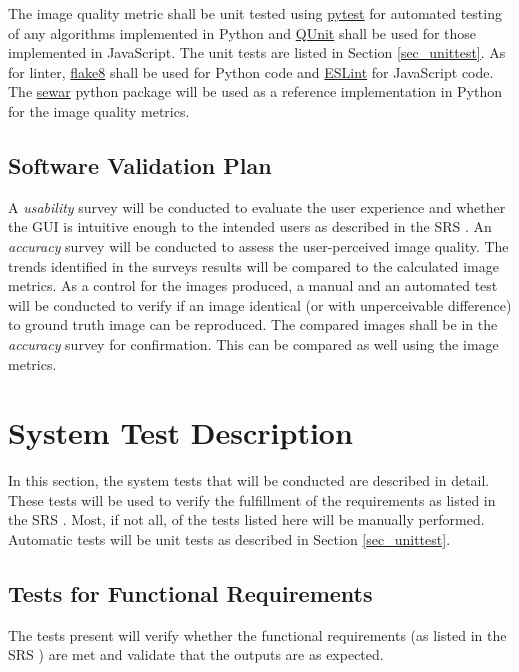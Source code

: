 \documentclass[12pt, titlepage]{article}
\begin{document}
The image quality metric shall be unit tested using \href{https://pytest.org}{pytest} for 
automated testing of any algorithms implemented in Python and \href{https://qunitjs.com}{QUnit} 
shall be used for those implemented in JavaScript. The unit tests are listed in 
Section \ref{sec_unittest}.
As for linter, \href{https://flake8.pycqa.org}{flake8} shall be used for Python code 
and \href{https://eslint.org}{ESLint} for JavaScript code.
The \href{https://github.com/andrewekhalel/sewar}{sewar} python package will be 
used as a reference implementation in Python for the image quality metrics.


\subsection{Software Validation Plan}
A \textit{usability} survey will be conducted to evaluate the user experience and whether 
the GUI is intuitive enough to the intended users as described in the SRS \citep{SRS}.
An \textit{accuracy} survey will be conducted to assess the user-perceived image quality. 
The trends identified in the surveys results will be compared to the calculated image metrics.
As a control for the images produced, a manual and an automated test will be conducted to verify if 
an image identical (or with unperceivable difference) to ground truth image can be reproduced.
The compared images shall be in the \textit{accuracy} survey for confirmation. This can be compared
as well using the image metrics. 


\section{System Test Description} \label{sec_systest_desc}

In this section, the system tests that will be conducted are described in detail. These tests
will be used to verify the fulfillment of the requirements as listed in the SRS \citep{SRS}.
Most, if not all, of the tests listed here will be manually performed. Automatic
tests will be unit tests as described in Section \ref{sec_unittest}.

\subsection{Tests for Functional Requirements}

The tests present will verify whether the functional requirements 
(as listed in the SRS \cite{SRS}) are met and validate that the outputs
are as expected.
\end{document}
